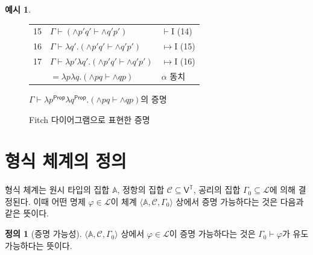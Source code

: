 \documentclass[10pt,twocolumn]{article}
\theoremstyle{definition}
\newtheorem{definition}[theorem]{정의}
\newtheorem{example}[theorem]{예시}
\newcommand{\Prop}{\mathsf{Prop}}
\begin{document}
\begin{example}
\begin{figure}[bt!]
{\begin{tabular}{lll}
			15 & $\Gamma\vdash ({\land}p'q'\vdash {\land}q'p')$ & $\vdash$I (14) \\
			16 & $\Gamma\vdash \lambda q'.({\land}p'q'\vdash {\land}q'p')$ & $\mapsto$I (15) \\
			17 & $\Gamma\vdash \lambda p'\lambda q'.({\land}p'q'\vdash {\land}q'p')$ & $\mapsto$I (16) \\
			& \qquad\quad$=\lambda p\lambda q.({\land}pq\vdash {\land}qp)$ & $\alpha$ 동치
		\end{tabular}}
		\caption{$\Gamma\vdash \lambda p^\Prop\lambda q^\Prop.({\land}pq\vdash{\land}qp)$의 증명} \label{fig:proof1}
	\end{figure}
	
	\begin{figure}[bt!] \centering\small{}
		\caption{Fitch 다이어그램으로 표현한 증명} \label{fig:proof2}
	\end{figure}
\end{example}

\section{형식 체계의 정의}

형식 체계는 원시 타입의 집합 $\mathbb A$, 정항의 집합 $\mathcal C\subseteq\mathsf V^{\mathds T}$, 공리의 집합 $\Gamma_0\subseteq\mathcal L$에 의해 결정된다. 이때 어떤 명제 $\varphi\in\mathcal L$이 체계 $\langle\mathbb A,\mathcal C,\Gamma_0\rangle$ 상에서 증명 가능하다는 것은 다음과 같은 뜻이다.

\begin{definition}[증명 가능성]
	$\langle\mathbb A,\mathcal C,\Gamma_0\rangle$ 상에서 $\varphi\in\mathcal L$이 증명 가능하다는 것은 $\Gamma_0\vdash\varphi$가 유도 가능하다는 뜻이다.
\end{definition}
\end{document}
